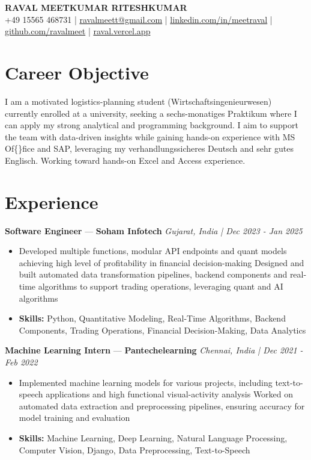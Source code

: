 \documentclass[a4paper,10pt]{article}
\begin{document}
\begin{center}
  {\Large\bfseries RAVAL MEETKUMAR RITESHKUMAR}\\[2pt]
  {\small +49 15565 468731 \;|\; \href{mailto:ravalmeett@gmail.com}{ravalmeett@gmail.com} \;|\; \href{https://www.linkedin.com/in/meetraval/}{linkedin.com/in/meetraval} \;|\; \href{https://github.com/ravalmeet}{github.com/ravalmeet} \;|\; \href{https://raval.vercel.app/}{raval.vercel.app}}
\end{center}
\vspace{-3pt}

\section*{Career Objective}
I am a motivated logistics-planning student (Wirtschaftsingenieurwesen) currently enrolled at a university, seeking a sechs-monatiges Praktikum where I can apply my strong analytical and programming background. I aim to support the team with data-driven insights while gaining hands-on experience with MS Of\{\}fice and SAP, leveraging my verhandlungssicheres Deutsch and sehr gutes Englisch. Working toward hands-on Excel and Access experience.\par

\section*{Experience}
\textbf{Software Engineer} — \textbf{Soham Infotech} \hfill \textit{Gujarat, India \;|\; Dec 2023 - Jan 2025}\par
\vspace{1pt}
\begin{itemize}
  \item Developed multiple functions, modular API endpoints and quant models achieving high level of profitability in financial decision-making Designed and built automated data transformation pipelines, backend components and real-time algorithms to support trading operations, leveraging quant and AI algorithms
  \item \textbf{Skills:} Python, Quantitative Modeling, Real-Time Algorithms, Backend Components, Trading Operations, Financial Decision-Making, Data Analytics
\end{itemize}
\vspace{3pt}
\textbf{Machine Learning Intern} — \textbf{Pantechelearning} \hfill \textit{Chennai, India \;|\; Dec 2021 - Feb 2022}\par
\vspace{1pt}
\begin{itemize}
  \item Implemented machine learning models for various projects, including text-to-speech applications and high functional visual-activity analysis Worked on automated data extraction and preprocessing pipelines, ensuring accuracy for model training and evaluation
  \item \textbf{Skills:} Machine Learning, Deep Learning, Natural Language Processing, Computer Vision, Django, Data Preprocessing, Text-to-Speech
\end{itemize}
\end{document}
